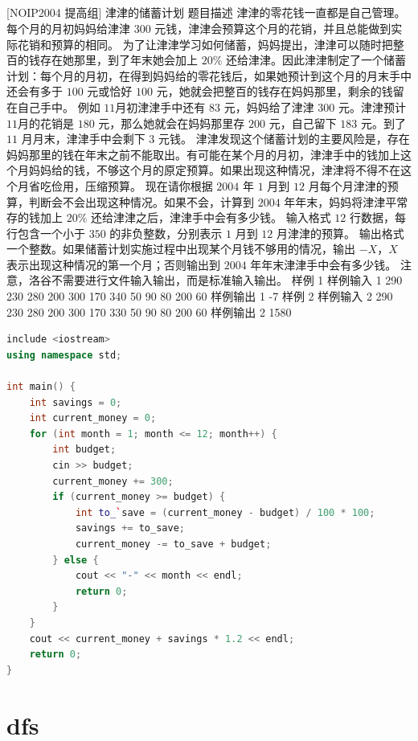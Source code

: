 \documentclass[12pt,twiside,a4paper]{ctexbook}
\numberwithin{chapter}{part}
\begin{document}
\section{}
 [NOIP2004 提高组] 津津的储蓄计划
 题目描述
津津的零花钱一直都是自己管理。每个月的月初妈妈给津津 $300$ 元钱，津津会预算这个月的花销，并且总能做到实际花销和预算的相同。
为了让津津学习如何储蓄，妈妈提出，津津可以随时把整百的钱存在她那里，到了年末她会加上 $20\%$ 还给津津。因此津津制定了一个储蓄计划：每个月的月初，在得到妈妈给的零花钱后，如果她预计到这个月的月末手中还会有多于 $100$ 元或恰好 $100$ 元，她就会把整百的钱存在妈妈那里，剩余的钱留在自己手中。
例如 $11$月初津津手中还有 $83$ 元，妈妈给了津津 $300$ 元。津津预计$11$月的花销是 $180$ 元，那么她就会在妈妈那里存 $200$ 元，自己留下 $183$ 元。到了 $11$ 月月末，津津手中会剩下 $3$ 元钱。
津津发现这个储蓄计划的主要风险是，存在妈妈那里的钱在年末之前不能取出。有可能在某个月的月初，津津手中的钱加上这个月妈妈给的钱，不够这个月的原定预算。如果出现这种情况，津津将不得不在这个月省吃俭用，压缩预算。
现在请你根据 $2004$ 年 $1$ 月到 $12$ 月每个月津津的预算，判断会不会出现这种情况。如果不会，计算到 $2004$ 年年末，妈妈将津津平常存的钱加上 $20\%$ 还给津津之后，津津手中会有多少钱。
 输入格式
$12$ 行数据，每行包含一个小于 $350$ 的非负整数，分别表示 $1$ 月到 $12$ 月津津的预算。
 输出格式
一个整数。如果储蓄计划实施过程中出现某个月钱不够用的情况，输出 $-X$，$X$ 表示出现这种情况的第一个月；否则输出到 $2004$ 年年末津津手中会有多少钱。
注意，洛谷不需要进行文件输入输出，而是标准输入输出。
 样例 1
 样例输入 1
290
230
280
200
300
170
340
50 
90 
80 
200
60
 样例输出 1
-7
 样例 2
 样例输入 2
290 
230 
280 
200 
300 
170 
330 
50 
90 
80 
200 
60
 样例输出 2
1580
\begin{lstlisting}[language=c++,breaklines=true]
include <iostream>
using namespace std;

int main() {
    int savings = 0;
    int current_money = 0;
    for (int month = 1; month <= 12; month++) {
        int budget;
        cin >> budget;
        current_money += 300;
        if (current_money >= budget) {
            int to_`save = (current_money - budget) / 100 * 100;
            savings += to_save;
            current_money -= to_save + budget;
        } else {
            cout << "-" << month << endl;
            return 0;
        }
    }
    cout << current_money + savings * 1.2 << endl;
    return 0;
}
\end{lstlisting}

\chapter{dfs}
\end{document}
